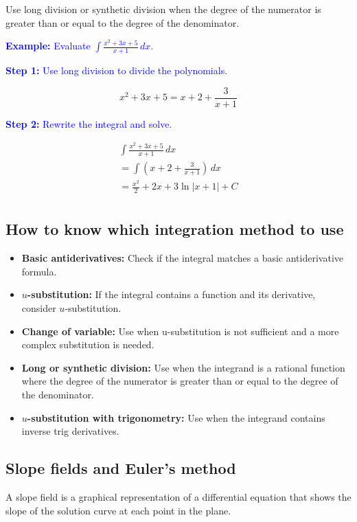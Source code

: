 \documentclass[letterpaper, 12pt]{article}
\newcommand{\example}[1]{\textcolor{blue}{\textbf{Example:} #1}}
\newcommand{\step}[2]{\textcolor{blue}{\textbf{Step #1:} #2}}
\begin{document}
Use long division or synthetic division when the degree of the numerator is greater than or equal to the degree of the denominator.

\example{Evaluate $\displaystyle \int \frac{x^2 + 3x + 5}{x + 1} \, dx$.}

\step{1}{Use long division to divide the polynomials.}

$$x^2 + 3x + 5 = x + 2 + \frac{3}{x + 1}$$

\step{2}{Rewrite the integral and solve.}

\begin{gather*}
\int \frac{x^2 + 3x + 5}{x + 1} \, dx \\
= \int (x + 2 + \frac{3}{x + 1}) \, dx \\
= \boxed{\frac{x^2}{2} + 2x + 3 \ln|x + 1| + C} \\
\end{gather*}

\subsection*{How to know which integration method to use}

\begin{itemize}
    \item \textbf{Basic antiderivatives:} Check if the integral matches a basic antiderivative formula.
    \item \textbf{$u$-substitution:} If the integral contains a function and its derivative, consider $u$-substitution.
    \item \textbf{Change of variable:} Use when u-substitution is not sufficient and a more complex substitution is needed.
    \item \textbf{Long or synthetic division:} Use when the integrand is a rational function where the degree of the numerator is greater than or equal to the degree of the denominator.
    \item \textbf{$u$-substitution with trigonometry:} Use when the integrand contains inverse trig derivatives.
\end{itemize}

\subsection*{Slope fields and Euler's method}

A slope field is a graphical representation of a differential equation that shows the slope of the solution curve at each point in the plane.
\end{document}
